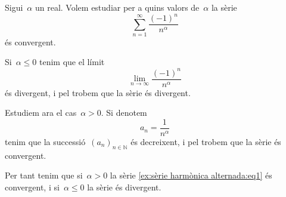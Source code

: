 \documentclass[../../main.tex]{subfiles}
\begin{document}
    \begin{example}
        \label{ex:sèrie harmònica alternada}
        Sigui~\(\alpha\) un real.
        Volem estudiar per a quins valors de~\(\alpha\) la sèrie
        \begin{equation}
            \label{ex:sèrie harmònica alternada:eq1}
            \sum_{n=1}^{\infty}\frac{(-1)^{n}}{n^{\alpha}}
        \end{equation}
        és convergent.
        \begin{solution}
            Si~\(\alpha\leq0\) tenim que el límit
            \[
                \lim_{n\to\infty}\frac{(-1)^{n}}{n^{\alpha}}
            \]
            és divergent, i pel \corollari{}  trobem que la sèrie és divergent.

            Estudiem ara el cas~\(\alpha>0\).
            Si denotem
            \[
                a_{n}=\frac{1}{n^{\alpha}}
            \]
            tenim que la successió~\((a_{n})_{n\in\mathbb{N}}\) és decreixent, i pel  trobem que la sèrie és convergent.

            Per tant tenim que si~\(\alpha>0\) la sèrie \eqref{ex:sèrie harmònica alternada:eq1} és convergent, i si~\(\alpha\leq0\) la sèrie és divergent.
        \end{solution}
    \end{example}
\end{document}
